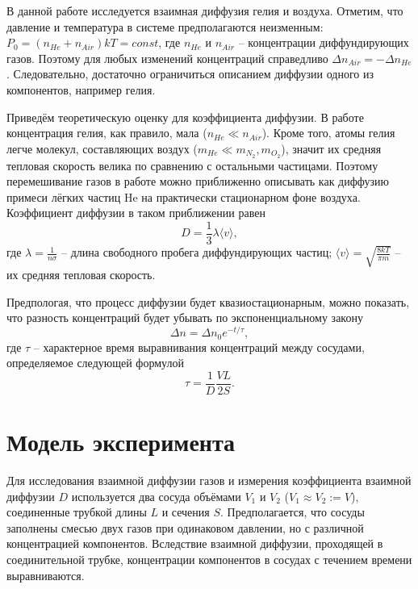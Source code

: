 \documentclass[a4paper,12pt]{article} %
\begin{document}
	В данной работе исследуется взаимная диффузия гелия и воздуха. Отметим, что давление и температура в системе предполагаются неизменным: $P_0 = (n_{He}+n_{Air})kT = const$, где $n_{He}$  и $n_{Air}$ -- концентрации диффундирующих газов. Поэтому для любых изменений концентраций справедливо $\Delta n_{Air} = -\Delta n_{He}$. Следовательно, достаточно ограничиться описанием диффузии одного из компонентов, например гелия.
	
	Приведём теоретическую оценку для коэффициента диффузии. В работе концентрация гелия, как правило, мала ($n_{He} \ll n_{Air}$). Кроме того, атомы гелия легче молекул, составляющих воздух ($m_{He} \ll m_{N_2}, m_{O_2}$), значит их средняя тепловая скорость велика по сравнению с остальными частицами. Поэтому перемешивание газов в работе можно приближенно описывать как диффузию примеси лёгких частиц He на практически стационарном фоне воздуха. Коэффициент диффузии в таком приближении равен
	\begin{equation}
		\label{D}
		D = \frac{1}{3} \lambda \langle v \rangle,
	\end{equation}
	где $\lambda = \frac{1}{n\sigma}$ -- длина свободного пробега диффундирующих частиц; $\langle v \rangle = \sqrt{\frac{8kT}{\pi m}}$ -- их средняя тепловая скорость.
	
	Предпологая, что процесс диффузии будет квазиостационарным, можно показать, что разность концентраций будет убывать по экспоненциальному закону
	\begin{equation}
		\label{Delta_n}
		\Delta n = \Delta n_0 e^{-t / \tau},
	\end{equation}
	где $\tau$ -- характерное время выравнивания концентраций между сосудами, определяемое следующей формулой
	\begin{equation}
		\label{Tau}
		\tau = \frac{1}{D} \frac{VL}{2S}.
	\end{equation}
	
\section{Модель эксперимента}
	Для   исследования   взаимной диффузии газов и измерения коэффициента взаимной диффузии  $D$  используется  два сосуда  объёмами  $V_1$ и $V_2$ ($V_1 \approx V_2 := V$), соединенные трубкой длины $L$ и сечения  $S$. Предполагается, что сосуды заполнены смесью двух газов при одинаковом давлении, но с различной концентрацией компонентов. Вследствие взаимной диффузии, проходящей в   соединительной трубке, концентрации компонентов в сосудах с течением времени выравниваются.
\end{document}
